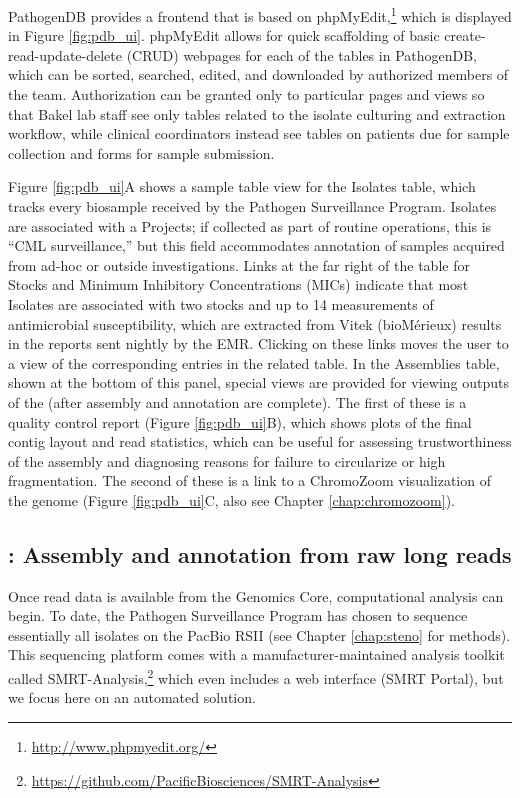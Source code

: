 PathogenDB provides a frontend that is based on phpMyEdit,\footnote{\url{http://www.phpmyedit.org/}} which is displayed in Figure \ref{fig:pdb_ui}. phpMyEdit allows for quick scaffolding of basic create-read-update-delete (CRUD) webpages for each of the tables in PathogenDB, which can be sorted, searched, edited, and downloaded by authorized members of the team. Authorization can be granted only to particular pages and views so that Bakel lab staff see only tables related to the isolate culturing and extraction workflow, while clinical coordinators instead see tables on patients due for sample collection and forms for sample submission.

Figure \ref{fig:pdb_ui}A shows a sample table view for the Isolates table, which tracks every biosample received by the Pathogen Surveillance Program. Isolates are associated with a Projects; if collected as part of routine operations, this is ``CML surveillance,'' but this field accommodates annotation of samples acquired from ad-hoc or outside investigations. Links at the far right of the table for Stocks and Minimum Inhibitory Concentrations (MICs) indicate that most Isolates are associated with two stocks and up to 14 measurements of antimicrobial susceptibility, which are extracted from Vitek (bioMérieux) results in the reports sent nightly by the EMR. Clicking on these links moves the user to a view of the corresponding entries in the related table. In the Assemblies table, shown at the bottom of this panel, special views are provided for viewing outputs of the \pathogendbpipeline{} (after assembly and annotation are complete). The first of these is a quality control report (Figure \ref{fig:pdb_ui}B), which shows plots of the final contig layout and read statistics, which can be useful for assessing trustworthiness of the assembly and diagnosing reasons for failure to circularize or high fragmentation. The second of these is a link to a ChromoZoom visualization of the genome (Figure \ref{fig:pdb_ui}C, also see Chapter \ref{chap:chromozoom}).

\subsection{\pathogendbpipeline: Assembly and annotation from raw long reads}

Once read data is available from the Genomics Core, computational analysis can begin. To date, the Pathogen Surveillance Program has chosen to sequence essentially all isolates on the PacBio RSII (see Chapter \ref{chap:steno} for methods). This sequencing platform comes with a manufacturer-maintained analysis toolkit called SMRT-Analysis,\footnote[][-2.5cm]{\url{https://github.com/PacificBiosciences/SMRT-Analysis}} which even includes a web interface (SMRT Portal), but we focus here on an automated solution.

